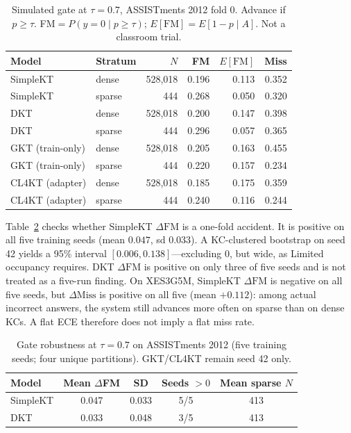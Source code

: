 \documentclass[journal,10pt,twocolumn]{IEEEtran}
\begin{document}
\begin{table}[!t]
\caption{Simulated gate at $\tau=0.7$, ASSISTments 2012 fold 0. Advance if $p\ge\tau$. FM$=P(y=0\mid p\ge\tau)$; $E[\mathrm{FM}]=E[1-p\mid A]$. Not a classroom trial.}
\label{tab:gate}
\centering
\setlength{\tabcolsep}{3.5pt}
\begin{tabular}{llrrrr}
\toprule
Model & Stratum & $N$ & FM & $E[\mathrm{FM}]$ & Miss \\
\midrule
SimpleKT & dense & 528{,}018 & 0.196 & 0.113 & 0.352 \\
SimpleKT & sparse & 444 & 0.268 & 0.050 & 0.320 \\
DKT & dense & 528{,}018 & 0.200 & 0.147 & 0.398 \\
DKT & sparse & 444 & 0.296 & 0.057 & 0.365 \\
GKT (train-only) & dense & 528{,}018 & 0.205 & 0.163 & 0.455 \\
GKT (train-only) & sparse & 444 & 0.220 & 0.157 & 0.234 \\
CL4KT (adapter) & dense & 528{,}018 & 0.185 & 0.175 & 0.359 \\
CL4KT (adapter) & sparse & 444 & 0.240 & 0.116 & 0.244 \\
\bottomrule
\end{tabular}
\end{table}

Table~\ref{tab:five} checks whether SimpleKT $\Delta\mathrm{FM}$ is a one-fold accident. It is positive on all five training seeds (mean $0.047$, sd $0.033$). A KC-clustered bootstrap on seed 42 yields a 95\% interval $[0.006, 0.138]$---excluding 0, but wide, as Limited occupancy requires. DKT $\Delta\mathrm{FM}$ is positive on only three of five seeds and is not treated as a five-run finding. On XES3G5M, SimpleKT $\Delta\mathrm{FM}$ is negative on all five seeds, but $\Delta\mathrm{Miss}$ is positive on all five (mean $+0.112$): among actual incorrect answers, the system still advances more often on sparse than on dense KCs. A flat ECE therefore does not imply a flat miss rate.

\begin{table}[!t]
\caption{Gate robustness at $\tau=0.7$ on ASSISTments 2012 (five training seeds; four unique partitions). GKT/CL4KT remain seed 42 only.}
\label{tab:five}
\centering
\begin{tabular}{lcccc}
\toprule
Model & Mean $\Delta$FM & SD & Seeds $>0$ & Mean sparse $N$ \\
\midrule
SimpleKT & 0.047 & 0.033 & 5/5 & 413 \\
DKT & 0.033 & 0.048 & 3/5 & 413 \\
\bottomrule
\end{tabular}
\end{table}
\end{document}
